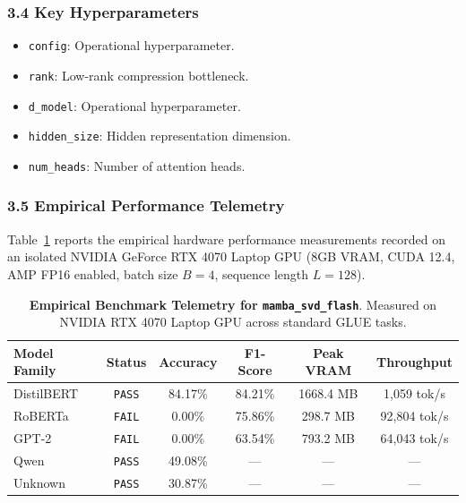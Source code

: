 \subsubsection*{3.4 Key Hyperparameters}
\begin{itemize}
    \item \texttt{config}: Operational hyperparameter.
    \item \texttt{rank}: Low-rank compression bottleneck.
    \item \texttt{d\_model}: Operational hyperparameter.
    \item \texttt{hidden\_size}: Hidden representation dimension.
    \item \texttt{num\_heads}: Number of attention heads.
\end{itemize}

\subsubsection*{3.5 Empirical Performance Telemetry}
Table~\ref{tab:telemetry_mamba_svd_flash} reports the empirical hardware performance measurements recorded on an isolated NVIDIA GeForce RTX 4070 Laptop GPU (8GB VRAM, CUDA 12.4, AMP FP16 enabled, batch size $B=4$, sequence length $L=128$).

\begin{table}[h]
\centering
\small
\caption{\textbf{Empirical Benchmark Telemetry for \texttt{mamba\_svd\_flash}}. Measured on NVIDIA RTX 4070 Laptop GPU across standard GLUE tasks.}
\label{tab:telemetry_mamba_svd_flash}
\begin{tabular*}{\columnwidth}{@{\extracolsep{\fill}}lccccc}
\toprule
\textbf{Model Family} & \textbf{Status} & \textbf{Accuracy} & \textbf{F1-Score} & \textbf{Peak VRAM} & \textbf{Throughput} \\
\midrule
DistilBERT & \texttt{PASS} & 84.17\% & 84.21\% & 1668.4 MB & 1,059 tok/s \\
RoBERTa & \texttt{FAIL} & 0.00\% & 75.86\% & 298.7 MB & 92,804 tok/s \\
GPT-2 & \texttt{FAIL} & 0.00\% & 63.54\% & 793.2 MB & 64,043 tok/s \\
Qwen & \texttt{PASS} & 49.08\% & --- & --- & --- \\
Unknown & \texttt{PASS} & 30.87\% & --- & --- & --- \\
\bottomrule
\end{tabular*}
\end{table}

